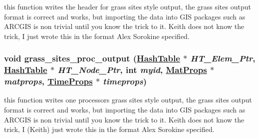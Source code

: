 this function writes the header for grass sites style output, the grass sites output format is correct and works, but importing the data into GIS packages such as ARCGIS is non trivial until you know the trick to it. Keith does not know the trick, I just wrote this in the format Alex Sorokine specified. 

\hypertarget{grassout_8C_a1}{
\subsubsection[grass\_\-sites\_\-proc\_\-output]{\setlength{\rightskip}{0pt plus 5cm}void grass\_\-sites\_\-proc\_\-output (\hyperlink{classHashTable}{Hash\-Table} $\ast$ {\em HT\_\-Elem\_\-Ptr}, \hyperlink{classHashTable}{Hash\-Table} $\ast$ {\em HT\_\-Node\_\-Ptr}, int {\em myid}, \hyperlink{structMatProps}{Mat\-Props} $\ast$ {\em matprops}, \hyperlink{structTimeProps}{Time\-Props} $\ast$ {\em timeprops})}}
\label{grassout_8C_a1}


this function writes one processors grass sites style output, the grass sites output format is correct and works, but importing the data into GIS packages such as ARCGIS is non trivial until you know the trick to it. Keith does not know the trick, I (Keith) just wrote this in the format Alex Sorokine specified. 

